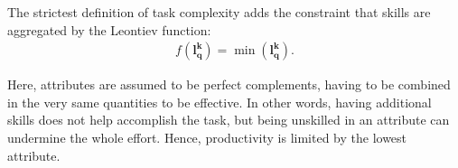 {\begin{definition}
\begin{subdefinition}
        \end{subdefinition}
        
        \begin{subdefinition}
            The strictest definition of task complexity adds the constraint that skills are aggregated by the Leontiev function:
            \begin{gather}
                f(\boldsymbol{l_{q}^{k}}) = 
                \min(\boldsymbol{l_{q}^{k}})
                .
            \end{gather}

            Here, attributes are assumed to be perfect complements, having to be combined in the very same quantities to be effective. In other words, having additional skills does not help accomplish the task, but being unskilled in an attribute can undermine the whole effort. Hence, productivity is limited by the lowest attribute.
        \end{subdefinition}

    \end{definition}
}


\newcommand{\SCL}{
    \label{scl}

    \begin{lemma}[Skill Composition Lemma]
        The Skill Composition Lemma (SCL) is a generalization of the SSL and states that skills are composable to accomplish complex tasks. More precisely, let $T_{q}^{l}$ be an activity of difficulty level $l$ that requires the $\boldsymbol{a_q} = (a_{1}^{q}, \dots, a_{m}^{q})$ skill set (i.e. $T_{q}^{l}$ is a complex task). With this, we demonstrate that any rational and sufficiently qualified economic agent can naturally ``piece together'', that is \textit{compose}, attributes $\{1, \dots, m\}$ to accomplish the $T_{q}^{l}$ complex task.
        
        \begin{proof}
            Given 
            \begin{gather}
                \tilde{T}_{q}^{k} = 
                \int_{0}^{1}{
                    T(l, l_{q}^{k})
                    dl
                }
            \end{gather}
        \end{proof}
    \end{lemma}
}

